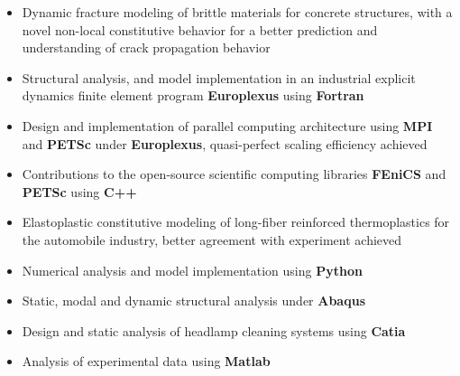 \documentclass[10pt,a4paper]{altacv}
\begin{document}
\divider

\begin{itemize}
\item Dynamic fracture modeling of brittle materials for concrete structures, with a novel non-local constitutive behavior for a better prediction and understanding of crack propagation behavior
\item Structural analysis, and model implementation in an industrial explicit dynamics finite element program \textbf{Europlexus} using \textbf{Fortran}
\item Design and implementation of parallel computing architecture using \textbf{MPI} and \textbf{PETSc} under \textbf{Europlexus}, quasi-perfect scaling efficiency achieved
\item Contributions to the open-source scientific computing libraries \textbf{FEniCS} and \textbf{PETSc} using \textbf{C++}
\end{itemize}

\divider

\begin{itemize}
\item Elastoplastic constitutive modeling of long-fiber reinforced thermoplastics for the automobile industry, better agreement with experiment achieved
\item Numerical analysis and model implementation using \textbf{Python}
\item Static, modal and dynamic structural analysis under \textbf{Abaqus}
\end{itemize}

\divider

\begin{itemize}
\item Design and static analysis of headlamp cleaning systems using \textbf{Catia}
\item Analysis of experimental data using \textbf{Matlab}
\end{itemize}
\end{document}
